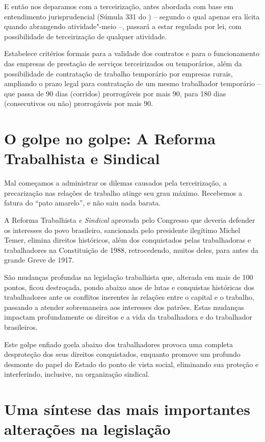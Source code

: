 E então nos deparamos com a terceirização, antes abordada com base em
entendimento jurisprudencial (Súmula 331 do ) -- segundo o qual apenas
era lícita quando abrangendo atividade"-meio --, passará a estar regulada
por lei, com possibilidade de terceirização de qualquer atividade.

Estabelece critérios formais para a validade dos contratos e para o
funcionamento das empresas de prestação de serviços terceirizados ou
temporários, além da possibilidade de contratação de trabalho temporário por
empresas rurais, ampliando o prazo legal para contratação de um mesmo
trabalhador temporário -- que passa de 90 dias (corridos) prorrogáveis
por mais 90, para 180 dias (consecutivos ou não) prorrogáveis por mais
90.

\section{O golpe no golpe: A Reforma Trabalhista e Sindical}

Mal começamos a administrar os dilemas causados pela terceirização,
a precarização nas relações de trabalho atinge seu grau máximo. Recebemos
a fatura do ``pato amarelo'', e não saiu nada barata.

A Reforma Trabalhista \emph{e Sindical} aprovada pelo Congresso que
deveria defender os interesses do povo brasileiro, sancionada
pelo presidente ilegítimo Michel Temer, elimina direitos históricos,
além dos conquistados pelas trabalhadoras e trabalhadores na
Constituição de 1988, retrocedendo, muitos deles, para antes da grande
Greve de 1917.

São mudanças profundas na legislação trabalhista que, alterada em mais
de 100 pontos, ficou destroçada, pondo abaixo anos de lutas e conquistas
históricas dos trabalhadores ante os conflitos inerentes às relações
entre o capital e o trabalho, passando a atender sobremaneira aos
interesses dos patrões. Estas mudanças impactam profundamente os
direitos e a vida da trabalhadora e do trabalhador brasileiros.

Este golpe enfiado goela abaixo dos trabalhadores provoca uma completa
desproteção dos seus direitos conquistados, enquanto promove um profundo
desmonte do papel do Estado do ponto de vista social, eliminando sua
proteção e interferindo, inclusive, na organização sindical.

\section{Uma síntese das mais importantes alterações na legislação}

